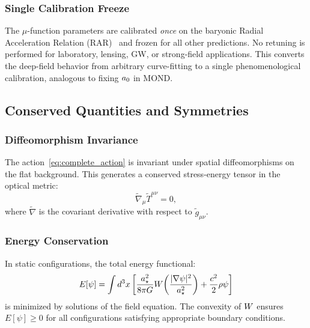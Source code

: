 \subsubsection{Single Calibration Freeze}

The $\mu$-function parameters are calibrated \emph{once} on the baryonic 
Radial Acceleration Relation (RAR)~\cite{McGaugh2016RAR} and frozen for 
all other predictions. No retuning is performed for laboratory, lensing, 
GW, or strong-field applications. This converts the deep-field behavior 
from arbitrary curve-fitting to a single phenomenological calibration, 
analogous to fixing $a_0$ in MOND.

\subsection{Conserved Quantities and Symmetries}\label{sec:conservation}

\subsubsection{Diffeomorphism Invariance}

The action~\eqref{eq:complete_action} is invariant under spatial 
diffeomorphisms on the flat background. This generates a conserved 
stress-energy tensor in the optical metric:
\begin{equation}
\tilde{\nabla}_\mu \tilde{T}^{\mu\nu} = 0,
\end{equation}
where $\tilde{\nabla}$ is the covariant derivative with respect to 
$\tilde{g}_{\mu\nu}$.

\subsubsection{Energy Conservation}

In static configurations, the total energy functional:
\begin{equation}
E[\psi] = \int d^3x \left[\frac{a_\star^2}{8\pi G}W\!\left(
\frac{|\nabla\psi|^2}{a_\star^2}\right) + \frac{c^2}{2}\rho\psi\right]
\end{equation}
is minimized by solutions of the field equation. The convexity of $W$ 
ensures $E[\psi] \geq 0$ for all configurations satisfying appropriate 
boundary conditions.

